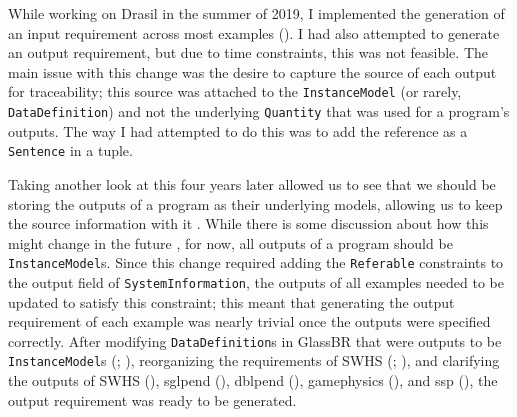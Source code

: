 While working on Drasil in the summer of 2019, I implemented the generation
of an input requirement across most examples ().
I had also attempted to generate an output requirement, but due to time
constraints, this was not feasible. The
main issue with this change was the desire to capture the source of each output
for traceability; this source was attached to the \texttt{InstanceModel}
(or rarely, \texttt{DataDefinition}) and not the underlying \texttt{Quantity}
that was used for a program's outputs. The way I had attempted to do this was
to add the reference as a \texttt{Sentence} in a tuple.

Taking another look at this four years later allowed us to
see that we should be storing the outputs of a program as their underlying
models, allowing us to keep the source information with it
. While there is some discussion about how this might
change in the future , for now, all outputs of a program should be
\texttt{InstanceModel}s. Since this change required adding the
\texttt{Referable}  constraints to the output field of
\texttt{SystemInformation}, the outputs of all examples needed to be updated to
satisfy this constraint; this meant that generating the output requirement of
each example was nearly trivial once the outputs were specified correctly.
After modifying \texttt{DataDefinition}s in GlassBR that were outputs to be
\texttt{InstanceModel}s (; ), reorganizing the
requirements of SWHS (; ), and clarifying the
outputs of SWHS (), \acs{sglpend} (),
\acs{dblpend} (), \acs{gamephysics} (), and
\acs{ssp} (), the output requirement was ready to be generated.
